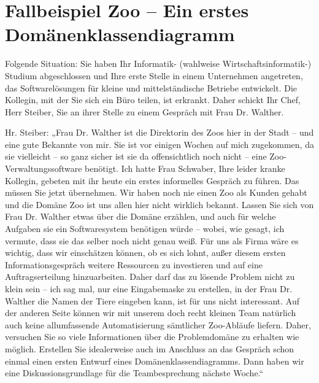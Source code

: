 \section{Fallbeispiel Zoo – Ein erstes Domänenklassendiagramm}
\label{sec:Kap-3.3}

Folgende Situation: Sie haben Ihr Informatik- (wahlweise Wirtschaftsinformatik-) Studium abgeschlossen und Ihre erste Stelle in einem Unternehmen angetreten, das Softwarelösungen für kleine und mittelständische Betriebe entwickelt. Die Kollegin, mit der Sie sich ein Büro teilen, ist erkrankt. Daher schickt Ihr Chef, Herr Steiber, Sie an ihrer Stelle zu einem Gespräch mit Frau Dr. Walther.


Hr. Steiber: „Frau Dr. Walther ist die Direktorin des Zoos hier in der Stadt – und eine gute Bekannte von mir. Sie ist vor einigen Wochen auf mich zugekommen, da sie vielleicht – so ganz sicher ist sie da offensichtlich noch nicht – eine Zoo-Verwaltungssoftware benötigt. Ich hatte Frau Schwaber, Ihre leider kranke Kollegin, gebeten mit ihr heute ein erstes informelles Gespräch zu führen. Das müssen Sie jetzt übernehmen. Wir haben noch nie einen Zoo als Kunden gehabt und die Domäne Zoo ist uns allen hier nicht wirklich bekannt. Lassen Sie sich von Frau Dr. Walther etwas über die Domäne erzählen, und auch für welche Aufgaben sie ein Softwaresystem benötigen würde – wobei, wie gesagt, ich vermute, dass sie das selber noch nicht genau weiß. Für uns als Firma wäre es wichtig, dass wir einschätzen können, ob es sich lohnt, außer diesem ersten Informationsgespräch weitere Ressourcen zu investieren und auf eine Auftragserteilung hinzuarbeiten. Daher darf das zu lösende Problem nicht zu klein sein – ich sag mal, nur eine Eingabemaske zu erstellen, in der Frau Dr. Walther die Namen der Tiere eingeben kann, ist für uns nicht interessant. Auf der anderen Seite können wir mit unserem doch recht kleinen Team natürlich auch keine allumfassende Automatisierung sämtlicher Zoo-Abläufe liefern. Daher, versuchen Sie so viele Informationen über die Problemdomäne zu erhalten wie möglich. Erstellen Sie idealerweise auch im Anschluss an das Gespräch schon einmal einen ersten Entwurf eines Domänenklassendiagramms. Dann haben wir eine Diskussionsgrundlage für die Teambesprechung nächste Woche.“


